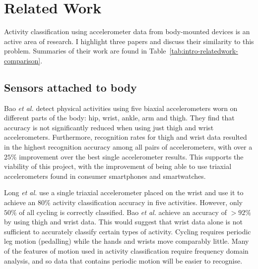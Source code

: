   \section{Related Work}
  \label{sec:intro-relatedwork}
    Activity classification using accelerometer data from body-mounted devices is an active area of
    research. I highlight three papers and discuss their similarity to this problem. Summaries of
    their work are found in Table~\ref{tab:intro-relatedwork-comparison}.
    
    \subsection{Sensors attached to body}
      Bao \emph{et al.} \cite{bao2004activity} detect physical activities using five biaxial accelerometers
      worn on different parts of the body: hip, wrist, ankle, arm and thigh. They find that accuracy  
      is not significantly reduced when using just thigh and wrist accelerometers. Furthermore,
      recognition rates for thigh and wrist data resulted in the highest recognition accuracy among
      all pairs of accelerometers, with over a $25\%$ improvement over the best single accelerometer
      results. This supports the viability of this project, with the improvement of being able to use 
      triaxial accelerometers found in consumer smartphones and smartwatches.
    
      Long \emph{et al.} \cite{long2009single} use a single triaxial accelerometer placed on the wrist and use it to achieve an $80\%$ activity classification accuracy in five activities. However, only $50\%$ of all cycling is correctly classified. Bao \emph{et al.} achieve an accuracy of $>92\%$ by using thigh and wrist data. This would suggest that wrist data alone is not sufficient to accurately classify certain types of activity. Cycling requires periodic leg motion (pedalling) while the hands and wrists move comparably little. Many of the features of motion used in activity classification require frequency domain analysis, and so data that contains periodic motion will be easier to recognise.
    
